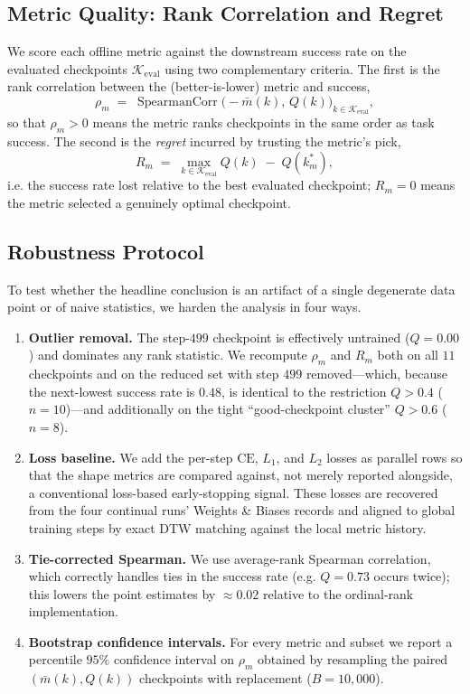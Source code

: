 \subsection{Metric Quality: Rank Correlation and Regret}

We score each offline metric against the downstream success rate on the evaluated
checkpoints $\mathcal{K}_{\mathrm{eval}}$ using two complementary criteria. The
first is the rank correlation between the (better-is-lower) metric and success,
\begin{equation}
\rho_m \;=\; \operatorname{SpearmanCorr}\bigl(-\bar m(k),\, Q(k)\bigr)_{k\in\mathcal{K}_{\mathrm{eval}}},
\label{eq:rho}
\end{equation}
so that $\rho_m>0$ means the metric ranks checkpoints in the same order as task
success. The second is the \emph{regret} incurred by trusting the metric's pick,
\begin{equation}
R_m \;=\; \max_{k\in\mathcal{K}_{\mathrm{eval}}} Q(k)\; -\; Q\!\left(k^*_m\right),
\label{eq:regret}
\end{equation}
i.e. the success rate lost relative to the best evaluated checkpoint; $R_m = 0$
means the metric selected a genuinely optimal checkpoint.

\subsection{Robustness Protocol}

To test whether the headline conclusion is an artifact of a single degenerate data
point or of naive statistics, we harden the analysis in four ways.
\begin{enumerate}
  \item \textbf{Outlier removal.} The step-$499$ checkpoint is effectively untrained
  ($Q=0.00$) and dominates any rank statistic. We recompute $\rho_m$ and $R_m$ both
  on all $11$ checkpoints and on the reduced set with step $499$ removed---which,
  because the next-lowest success rate is $0.48$, is identical to the restriction
  $Q>0.4$ ($n=10$)---and additionally on the tight ``good-checkpoint cluster''
  $Q>0.6$ ($n=8$).
  \item \textbf{Loss baseline.} We add the per-step $\mathrm{CE}$, $L_1$, and $L_2$
  losses as parallel rows so that the shape metrics are compared against, not merely
  reported alongside, a conventional loss-based early-stopping signal. These losses
  are recovered from the four continual runs' Weights \& Biases records and aligned
  to global training steps by exact DTW matching against the local metric history.
  \item \textbf{Tie-corrected Spearman.} We use average-rank Spearman correlation,
  which correctly handles ties in the success rate (e.g. $Q=0.73$ occurs twice); this
  lowers the point estimates by $\approx 0.02$ relative to the ordinal-rank
  implementation.
  \item \textbf{Bootstrap confidence intervals.} For every metric and subset we
  report a percentile $95\%$ confidence interval on $\rho_m$ obtained by resampling
  the paired $(\bar m(k),Q(k))$ checkpoints with replacement ($B=10{,}000$).
\end{enumerate}


